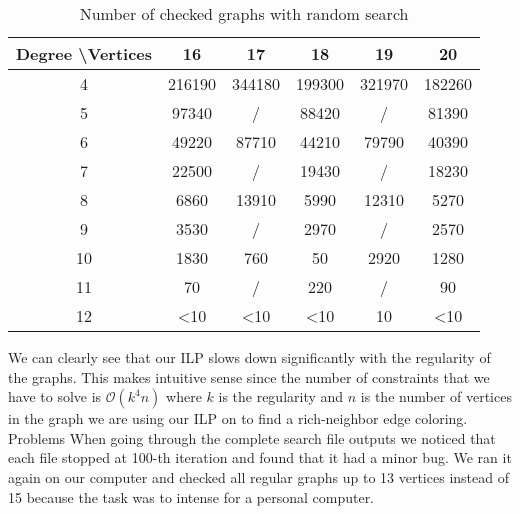 \documentclass[12pt,a4paper]{amsart}
\makeatletter
\renewcommand\subsection{\@startsection{subsection}{2}
  \z@{.5\linespacing\@plus.7\linespacing}{.5\linespacing}
  {\normalfont\scshape}}
\theoremstyle{definition} %
\theoremstyle{plain} %
\makeatother
\begin{document}
    \begin{table}[!htbp]
        \begin{tabular}{|c|c|c|c|c|c|}
        \hline
        Degree \textbackslash Vertices & 16            & 17            & 18            & 19     & 20            \\ \hline
        4                              & 216190        & 344180        & 199300        & 321970 & 182260        \\
        5                              & 97340         & /             & 88420         & /      & 81390         \\
        6                              & 49220         & 87710         & 44210         & 79790  & 40390         \\
        7                              & 22500         & /             & 19430         & /      & 18230         \\
        8                              & 6860          & 13910         & 5990          & 12310  & 5270          \\
        9                              & 3530          & /             & 2970          & /      & 2570          \\
        10                             & 1830          & 760           & 50            & 2920   & 1280          \\
        11                             & 70            & /             & 220           & /      & 90            \\
        12                             & \textless{}10 & \textless{}10 & \textless{}10 & 10     & \textless{}10 \\ \hline
        \end{tabular}
        \caption{Number of checked graphs with random search}
        \label{table:2}
    \end{table}
    
    \noindent We can clearly see that our ILP slows down significantly with the regularity of the graphs. This makes intuitive sense since the number of constraints that we have to solve is $\mathcal{O}(k^4n)$ where $k$ is the regularity and $n$ is the number of vertices in the graph we are using our ILP on to find a rich-neighbor edge coloring.\\
    
    \subsection{Problems}
    When going through the complete search file outputs we noticed that each file stopped at 100-th iteration and found that it had a minor bug. We ran it again on our computer and checked all regular graphs up to 13 vertices instead of 15 because the task was to intense for a personal computer.\\
\end{document}
